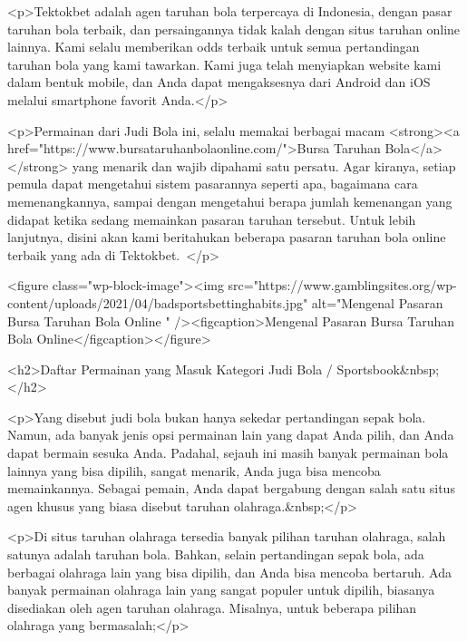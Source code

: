 {<p>Tektokbet adalah agen taruhan bola terpercaya di Indonesia, dengan pasar taruhan bola terbaik, dan persaingannya tidak kalah dengan situs taruhan online lainnya. Kami selalu memberikan odds terbaik untuk semua pertandingan taruhan bola yang kami tawarkan. Kami juga telah menyiapkan website kami dalam bentuk mobile, dan Anda dapat mengaksesnya dari Android dan iOS melalui smartphone favorit Anda.</p>



<p>Permainan dari Judi Bola ini, selalu memakai berbagai macam <strong><a href="https://www.bursataruhanbolaonline.com/">Bursa Taruhan Bola</a></strong> yang menarik dan wajib dipahami satu persatu. Agar kiranya, setiap pemula dapat mengetahui sistem pasarannya seperti apa, bagaimana cara memenangkannya, sampai dengan mengetahui berapa jumlah kemenangan yang didapat ketika sedang memainkan pasaran taruhan tersebut. Untuk lebih lanjutnya, disini akan kami beritahukan beberapa pasaran taruhan bola online terbaik yang ada di Tektokbet. </p>



<figure class="wp-block-image"><img src="https://www.gamblingsites.org/wp-content/uploads/2021/04/badsportsbettinghabits.jpg" alt="Mengenal Pasaran Bursa Taruhan Bola Online  " /><figcaption>Mengenal Pasaran Bursa Taruhan Bola Online</figcaption></figure>



<h2>Daftar Permainan yang Masuk Kategori Judi Bola / Sportsbook&nbsp;</h2>



<p>Yang disebut judi bola bukan hanya sekedar pertandingan sepak bola. Namun, ada banyak jenis opsi permainan lain yang dapat Anda pilih, dan Anda dapat bermain sesuka Anda. Padahal, sejauh ini masih banyak permainan bola lainnya yang bisa dipilih, sangat menarik, Anda juga bisa mencoba memainkannya. Sebagai pemain, Anda dapat bergabung dengan salah satu situs agen khusus yang biasa disebut taruhan olahraga.&nbsp;</p>



<p>Di situs taruhan olahraga tersedia banyak pilihan taruhan olahraga, salah satunya adalah taruhan bola. Bahkan, selain pertandingan sepak bola, ada berbagai olahraga lain yang bisa dipilih, dan Anda bisa mencoba bertaruh. Ada banyak permainan olahraga lain yang sangat populer untuk dipilih, biasanya disediakan oleh agen taruhan olahraga. Misalnya, untuk beberapa pilihan olahraga yang bermasalah;</p>



}
